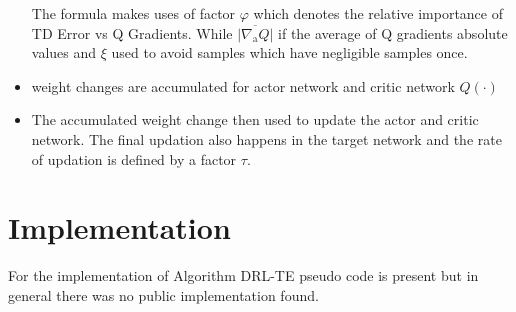 \begin{itemize}
The formula makes uses of factor $\varphi$ which denotes the relative importance of TD Error vs Q Gradients. While $\overline{\left|\nabla_{\mathrm{a}} Q\right|}$ if the average of Q gradients absolute values and $\xi$ used to avoid samples which have negligible samples once.
\item weight changes are accumulated for actor network 
and critic network $Q(\cdot)$ 
\item The accumulated weight change then used to update the actor and critic network. The final updation also happens in the target network and the rate of updation is defined by a factor $\tau$.
\end{itemize}

\section{Implementation}

For the implementation of Algorithm DRL-TE \cite{Exp:_DRLapproach} pseudo code is present but in general there was no public implementation found.


